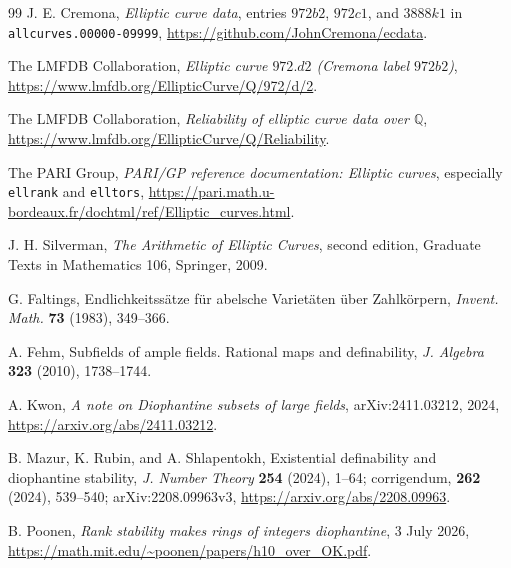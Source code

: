 \documentclass[11pt,a4paper]{article}
\theoremstyle{definition}
\newcommand{\Q}{\mathbb Q}\newcommand{\Z}{\mathbb Z}
\begin{document}
\begin{thebibliography}{99}
J. E. Cremona, \emph{Elliptic curve data}, entries $972b2$, $972c1$,
and $3888k1$ in \texttt{allcurves.00000-09999},
\url{https://github.com/JohnCremona/ecdata}.

The LMFDB Collaboration, \emph{Elliptic curve $972.d2$ (Cremona
label $972b2$)},
\url{https://www.lmfdb.org/EllipticCurve/Q/972/d/2}.

The LMFDB Collaboration, \emph{Reliability of elliptic curve data
over $\Q$},
\url{https://www.lmfdb.org/EllipticCurve/Q/Reliability}.

The PARI Group, \emph{PARI/GP reference documentation: Elliptic curves},
especially \texttt{ellrank} and \texttt{elltors},
\url{https://pari.math.u-bordeaux.fr/dochtml/ref/Elliptic_curves.html}.

J. H. Silverman, \emph{The Arithmetic of Elliptic Curves},
second edition, Graduate Texts in Mathematics 106,
Springer, 2009.

G. Faltings, Endlichkeitss\"atze f\"ur abelsche Variet\"aten
\"uber Zahlk\"orpern, \emph{Invent. Math.} \textbf{73} (1983),
349--366.

A. Fehm, Subfields of ample fields. Rational maps and definability,
\emph{J. Algebra} \textbf{323} (2010), 1738--1744.

A. Kwon, \emph{A note on Diophantine subsets of large fields},
arXiv:2411.03212, 2024,
\url{https://arxiv.org/abs/2411.03212}.

B. Mazur, K. Rubin, and A. Shlapentokh,
Existential definability and diophantine stability,
\emph{J. Number Theory} \textbf{254} (2024), 1--64;
corrigendum, \textbf{262} (2024), 539--540;
arXiv:2208.09963v3,
\url{https://arxiv.org/abs/2208.09963}.

B. Poonen, \emph{Rank stability makes rings of integers diophantine},
3 July 2026,
\url{https://math.mit.edu/~poonen/papers/h10_over_OK.pdf}.
\end{thebibliography}
\end{document}

